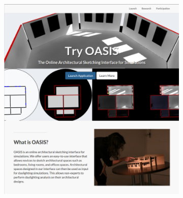 \documentclass[12pt]{article}
\begin{document}
\begin{figure}[h]
  \begin{subfigure}{.5\textwidth}
    \centering
    \includegraphics[scale=0.3]{preview}
  \end{subfigure}%
  \begin{subfigure}{.5\textwidth}
    \centering

\end{subfigure}
\end{figure}
\end{document}
